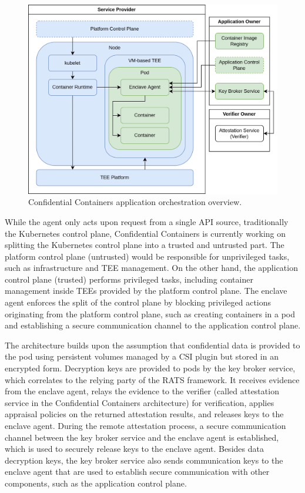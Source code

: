 \begin{figure}[H]
  \centering
  \includegraphics[width=0.8\linewidth]{resources/confidential-containers.drawio.png}
  \caption{Confidential Containers application orchestration overview.}
\end{figure}

While the agent only acts upon request from a single API source, traditionally
the Kubernetes control plane, Confidential Containers is currently working on
splitting the Kubernetes control plane into a trusted and untrusted part. The
platform control plane (untrusted) would be responsible for unprivileged tasks,
such as infrastructure and TEE management. On the other hand, the application
control plane (trusted) performs privileged tasks, including container
management inside TEEs provided by the platform control plane. The enclave agent
enforces the split of the control plane by blocking privileged actions
originating from the platform control plane, such as creating containers in a
pod and establishing a secure communication channel to the application control
plane.

The architecture builds upon the assumption that confidential data is provided
to the pod using persistent volumes managed by a CSI plugin but stored in an
encrypted form. Decryption keys are provided to pods by the key broker service,
which correlates to the relying party of the RATS framework. It receives
evidence from the enclave agent, relays the evidence to the verifier (called
attestation service in the Confidential Containers architecture) for
verification, applies appraisal policies on the returned attestation results,
and releases keys to the enclave agent. During the remote attestation process, a
secure communication channel between the key broker service and the enclave
agent is established, which is used to securely release keys to the enclave
agent. Besides data decryption keys, the key broker service also sends
communication keys to the enclave agent that are used to establish secure
communication with other components, such as the application control plane.

